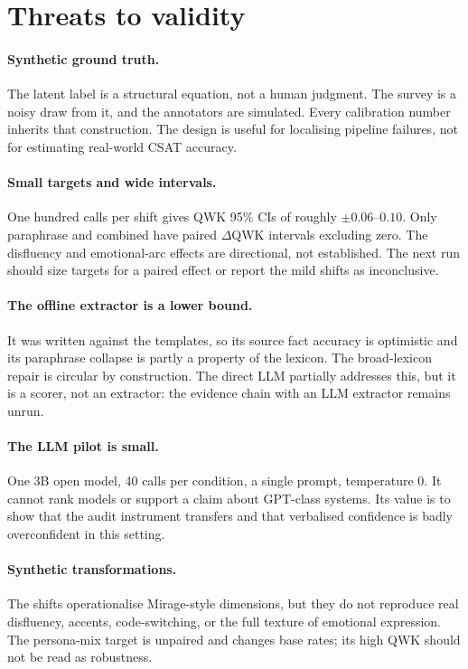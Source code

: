 \documentclass[11pt,a4paper]{article}
\begin{document}
\section{Threats to validity}
\label{sec:threats}

\paragraph{Synthetic ground truth.}
The latent label is a structural equation, not a human judgment. The survey is a noisy draw from
it, and the annotators are simulated. Every calibration number inherits that construction. The
design is useful for localising pipeline failures, not for estimating real-world CSAT accuracy.

\paragraph{Small targets and wide intervals.}
One hundred calls per shift gives QWK 95\% CIs of roughly $\pm0.06$--$0.10$. Only paraphrase and
combined have paired $\Delta$QWK intervals excluding zero. The disfluency and emotional-arc
effects are directional, not established. The next run should size targets for a paired effect
or report the mild shifts as inconclusive.

\paragraph{The offline extractor is a lower bound.}
It was written against the templates, so its source fact accuracy is optimistic and its
paraphrase collapse is partly a property of the lexicon. The broad-lexicon repair is circular by
construction. The direct LLM partially addresses this, but it is a scorer, not an extractor: the
evidence chain with an LLM extractor remains unrun.

\paragraph{The LLM pilot is small.}
One 3B open model, 40 calls per condition, a single prompt, temperature 0. It cannot rank models
or support a claim about GPT-class systems. Its value is to show that the audit instrument
transfers and that verbalised confidence is badly overconfident in this setting.

\paragraph{Synthetic transformations.}
The shifts operationalise Mirage-style dimensions, but they do not reproduce real disfluency,
accents, code-switching, or the full texture of emotional expression. The persona-mix target is
unpaired and changes base rates; its high QWK should not be read as robustness.
\end{document}
